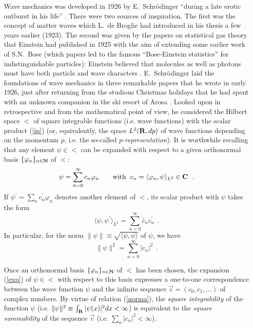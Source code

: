 \documentclass[12pt]{report}
\begin{document}
Wave mechanics was developed in 1926 by E.~Schr\"odinger
``during a late erotic outburst in his life''  \cite{pais,moore}. 
There were two sources of 
inspiration. The first was the concept of matter waves which 
L.~de Broglie had introduced in his thesis 
a few years earlier (1923). The second was given by the papers
 on statistical gas theory that 
Einstein had published in 1925 with the aim of extending 
some earlier work 
of S.N.~Bose (which papers led to the famous 
``Bose-Einstein statistics'' for indistinguishable 
particles):
Einstein believed that molecules as well as photons must 
have both particle and wave characters \cite{moore}.
E.~Schr\"odinger laid the foundations of wave mechanics 
in three remarkable papers
that he wrote 
in early 1926, just after returning from 
the studious Christmas holidays 
that he had spent with an unknown companion in  
the ski resort of Arosa \cite{moore}.    
Looked upon in retrospective and 
from the mathematical point of view, 
he considered the Hilbert space $\lt$
of square integrable functions (i.e. wave
functions) with the scalar product (\ref{ip}) 
(or, equivalently, the space 
$L^2 ({\bf R}, dp)$ of wave functions depending on the momentum
$p$, i.e. the so-called {\em $p$-representation}). 
It is worthwhile recalling that 
any element $\psi \in \lt$ can be expanded with respect 
to a given orthonormal basis 
 $\{ \varphi_n \} _{n\in {\bf N}}$ of $\lt$:
\begin{equation}
\label{exp}
\psi = \sum_{n =0}^{\infty} c_n  \varphi_n  
\qquad {\rm with} \ \;
c_n = \langle \varphi_n , \psi \rangle _{L^2} \in {\bf C} 
\ \ .
\end{equation}
If $\psi^{\prime} = \sum_{n} c_n^{\prime}  \varphi_n$ 
denotes another element of  $\lt$, its scalar product
with $\psi$ takes the form 
\begin{equation}  
\label{exun}
\langle \psi , \psi^{\prime} \rangle _{L^2}
= \sum _{n  =0}^{\infty} \bar c_n c_n ^{\prime}
\ \ .
\end{equation}
In particular, for the norm $\| \psi \| 
\equiv \sqrt{\langle \psi , \psi \rangle}$ of $\psi$, 
we have 
\begin{equation}  
\label{norma} 
\| \psi \| ^2 = 
\sum _{n  =0}^{\infty} | c_n | ^2 
\ \ .
\end{equation}    
 

 

\medskip 

Once an orthonormal basis  
$\{ \varphi_n \} _{n\in {\bf N}}$ of $\lt$ has been chosen, 
the expansion (\ref{exp}) of $\psi \in \lt$ 
with respect to this basis  
expresses a one-to-one correspondence between the 
wave function $\psi$ and the infinite sequence  
$\vec c = (c_0, c_1,...)$ of complex numbers.
By virtue of relation (\ref{norma}), 
the {\em square integrability} of the function $\psi$ 
(i.e. $\| \psi \|^2 \equiv \int_{{\bf R}} | \psi (x)|^2 dx 
< \infty$) 
is equivalent 
to the {\em square summability} of the sequence $\vec c$
(i.e. $\sum_n | c_n |^2 < \infty$).  
\end{document}
